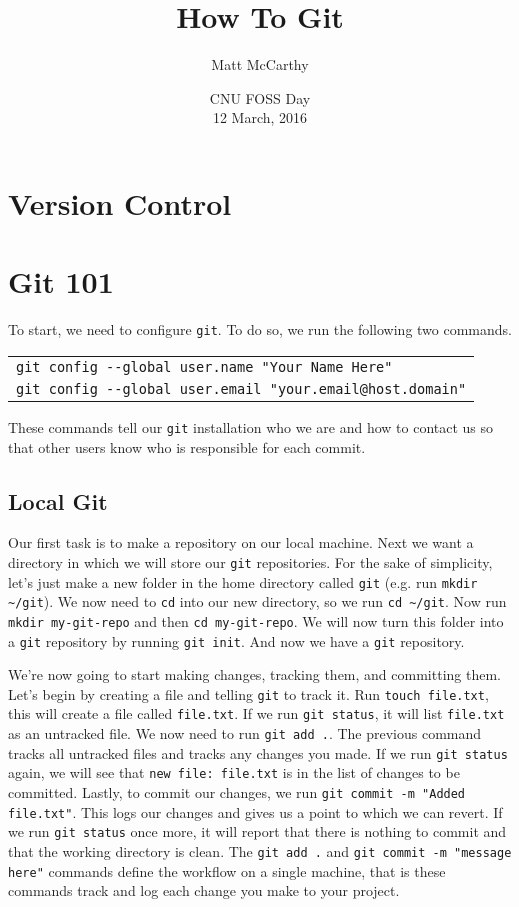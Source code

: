 \documentclass[notitlepage]{simple}
\author{Matt McCarthy}
\title{How To Git}
\date{CNU FOSS Day\\ 12 March, 2016}
\begin{document}
\maketitle

\section{Version Control}


\section{Git 101}

To start, we need to configure \verb|git|.
To do so, we run the following two commands.
\begin{center}
	\begin{tabular}{l}
		\verb|git config --global user.name "Your Name Here"|\\
		\verb|git config --global user.email "your.email@host.domain"|
	\end{tabular}
\end{center}
These commands tell our \verb|git| installation who we are and how to contact us so that other users know who is responsible for each commit.

\subsection{Local Git}

Our first task is to make a repository on our local machine.
Next we want a directory in which we will store our \verb|git| repositories.
For the sake of simplicity, let's just make a new folder in the home directory called \verb|git| (e.g. run \verb|mkdir ~/git|).
We now need to \verb|cd| into our new directory, so we run \verb|cd ~/git|.
Now run \verb|mkdir my-git-repo| and then \verb|cd my-git-repo|.
We will now turn this folder into a \verb|git| repository by running \verb|git init|.
And now we have a \verb|git| repository.

We're now going to start making changes, tracking them, and committing them.
Let's begin by creating a file and telling \verb|git| to track it.
Run \verb|touch file.txt|, this will create a file called \verb|file.txt|.
If we run \verb|git status|, it will list \verb|file.txt| as an untracked file.
We now need to run \verb|git add .|.
The previous command tracks all untracked files and tracks any changes you made.
If we run \verb|git status| again, we will see that \verb|new file: file.txt| is in the list of changes to be committed.
Lastly, to commit our changes, we run \verb|git commit -m "Added file.txt"|.
This logs our changes and gives us a point to which we can revert.
If we run \verb|git status| once more, it will report that there is nothing to commit and that the working directory is clean.
The \verb|git add .| and \verb|git commit -m "message here"| commands define the workflow on a single machine, that is these commands track and log each change you make to your project.
\end{document}
